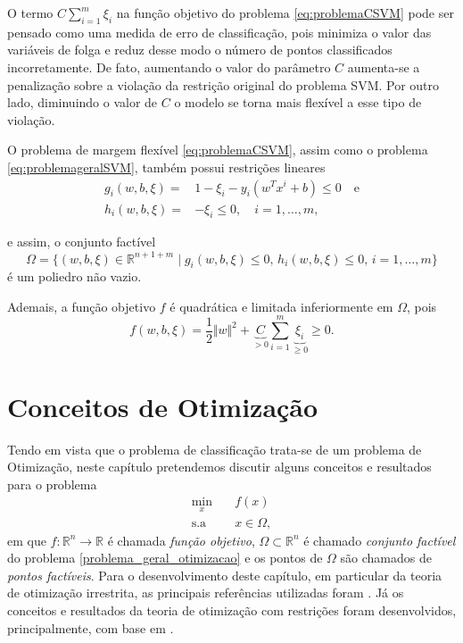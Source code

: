 \documentclass[12pt,a4paper]{scrartcl}
\def\RR{\mathds{R}}
\theoremstyle{definition}%
\begin{document}
O termo $C \sum_{i=1}^{m} \xi_{i}$ na função objetivo do problema \eqref{eq:problemaCSVM} pode ser pensado como uma medida de erro de classificação, pois minimiza o valor das variáveis de folga e reduz desse modo o número de pontos classificados incorretamente. De fato, aumentando o valor do parâmetro $C$ aumenta-se a penalização sobre a violação da restrição original do problema SVM. Por outro lado, diminuindo o valor de $C$ o modelo se torna mais flexível a esse tipo de violação. 

O problema de margem flexível \eqref{eq:problemaCSVM}, assim como o problema \eqref{eq:problemageralSVM}, também possui restrições lineares 
\begin{align} 
g_{i}(w,b,\xi) = & 1-\xi_{i} - y_i(w^{T}x^{i}+b) \leq 0 \quad \text{e} \\
h_{i}(w,b,\xi) = & - \xi_{i} \leq 0, \quad i=1, \ldots, m,
\end{align}

e assim, o conjunto factível
\[
\Omega = \{(w,b,\xi) \in \RR^{n+1+m} \mid g_{i}(w,b,\xi) \leq 0, \, h_{i}(w,b,\xi) \leq 0, \, i=1, \ldots, m \} 
\]
é um poliedro não vazio.

Ademais, a função objetivo $f$ é quadrática e limitada inferiormente em $\Omega$, pois 
\[
f(w,b,\xi) = \dfrac{1}{2} \Vert w\Vert^{2} + \underbrace{C}_{> 0} \sum_{i=1}^{m} \underbrace{\xi_{i}}_{\geq 0} \geq 0.
\]




\newpage
\section{Conceitos de Otimização} \label{chap:conceitos_de_otimizacao}


Tendo em vista que o problema de classificação trata-se de um problema de Otimização, neste capítulo pretendemos discutir alguns conceitos e resultados para o problema 
\[ \label{problema_geral_otimizacao}
\begin{aligned}
\min_{x} & \quad f(x) \\
\text{s.a} & \quad x \in \Omega ,
\end{aligned}
\]
em que $f: \RR^{n} \rightarrow \RR$ é chamada \emph{função objetivo}, $\Omega \subset \RR^{n}$ é chamado \emph{conjunto factível} do problema \eqref{problema_geral_otimizacao} e os pontos de $\Omega$ são chamados de \emph{pontos factíveis}. Para o desenvolvimento deste capítulo, em particular da teoria de otimização irrestrita, as principais referências utilizadas foram \textcite{Izmailov2014ac,Ademir2013}. Já os conceitos e resultados da teoria de otimização com restrições foram desenvolvidos, principalmente, com base em \textcite{Ana1994,luenberger2008linear}.  
\end{document}
